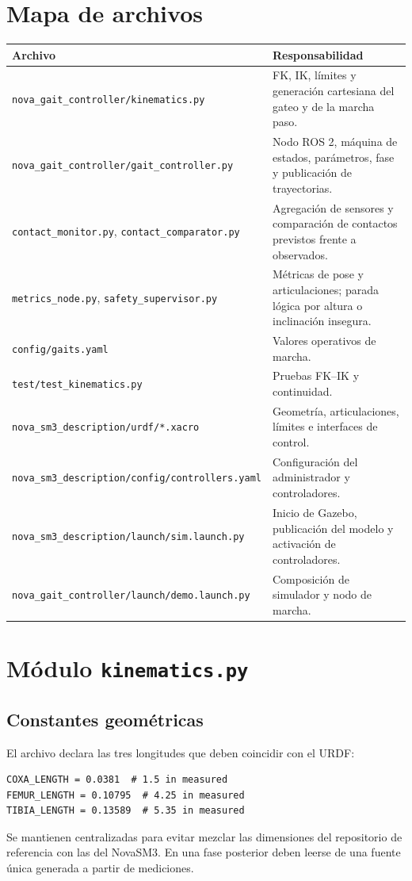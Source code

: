 \documentclass[11pt,a4paper]{article}
\begin{document}
\section{Mapa de archivos}
\begin{table}[h]
\centering
\small
\begin{tabular}{p{}p{}}
\toprule
Archivo & Responsabilidad\\
\midrule
\texttt{nova\_gait\_controller/kinematics.py} & FK, IK, límites y generación
cartesiana del gateo y de la marcha paso.\\
\texttt{nova\_gait\_controller/gait\_controller.py} & Nodo ROS 2, máquina de
estados, parámetros, fase y publicación de trayectorias.\\
\texttt{contact\_monitor.py}, \texttt{contact\_comparator.py} & Agregación de
sensores y comparación de contactos previstos frente a observados.\\
\texttt{metrics\_node.py}, \texttt{safety\_supervisor.py} & Métricas de pose y
articulaciones; parada lógica por altura o inclinación insegura.\\
\texttt{config/gaits.yaml} & Valores operativos de marcha.\\
\texttt{test/test\_kinematics.py} & Pruebas FK--IK y continuidad.\\
\texttt{nova\_sm3\_description/urdf/*.xacro} & Geometría, articulaciones,
límites e interfaces de control.\\
\texttt{nova\_sm3\_description/config/controllers.yaml} & Configuración del
administrador y controladores.\\
\texttt{nova\_sm3\_description/launch/sim.launch.py} & Inicio de Gazebo,
publicación del modelo y activación de controladores.\\
\texttt{nova\_gait\_controller/launch/demo.launch.py} & Composición de
simulador y nodo de marcha.\\
\bottomrule
\end{tabular}
\end{table}

\section{Módulo \texttt{kinematics.py}}
\subsection{Constantes geométricas}
El archivo declara las tres longitudes que deben coincidir con el URDF:
\begin{lstlisting}[style=python]
COXA_LENGTH = 0.0381  # 1.5 in measured
FEMUR_LENGTH = 0.10795  # 4.25 in measured
TIBIA_LENGTH = 0.13589  # 5.35 in measured
\end{lstlisting}
Se mantienen centralizadas para evitar mezclar las dimensiones del repositorio
de referencia con las del NovaSM3. En una fase posterior deben leerse de una
fuente única generada a partir de mediciones.
\end{document}
